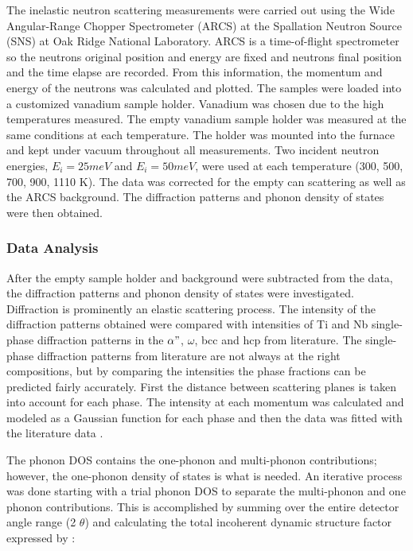 The inelastic neutron scattering measurements were carried out using the Wide Angular-Range Chopper Spectrometer (ARCS) at the Spallation Neutron Source (SNS) at Oak Ridge National Laboratory. ARCS is a time-of-flight spectrometer so the neutrons original position and energy are fixed and neutrons final position and the time elapse are recorded. From this information, the momentum and energy of the neutrons was calculated and plotted. The samples were loaded into a customized vanadium sample holder. Vanadium was chosen due to the high temperatures measured. The empty vanadium sample holder was measured at the same conditions at each temperature. The holder was mounted into the furnace and kept under vacuum throughout all measurements. Two incident neutron energies, $E_{i} = 25 meV$ and $E_{i} = 50 meV$, were used at each temperature (300, 500, 700, 900, 1110 K). The data was corrected for the empty can scattering as well as the ARCS background. The diffraction patterns and phonon density of states were then obtained.

\subsubsection{Data Analysis}

After the empty sample holder and background were subtracted from the data, the diffraction patterns and phonon density of states were investigated. Diffraction is prominently an elastic scattering process. The intensity of the diffraction patterns obtained were compared with intensities of Ti and Nb single-phase diffraction patterns in the $\alpha"$, $\omega$, bcc and hcp from literature. The single-phase diffraction patterns from literature are not always at the right compositions, but by comparing the intensities the phase fractions can be predicted fairly accurately. First the distance between scattering planes is taken into account for each phase. The intensity at each momentum was calculated and modeled as a Gaussian function for each phase and then the data was fitted with the literature data \cite{Young1998,Toraya1986}. 

The phonon DOS contains the one-phonon and multi-phonon contributions; however, the one-phonon density of states is what is needed. An iterative process was done starting with a trial phonon DOS to separate the multi-phonon and one phonon contributions. This is accomplished by summing over the entire detector angle range (2 $\theta$) and calculating the total incoherent dynamic structure factor expressed by \cite{Manley2001}:

